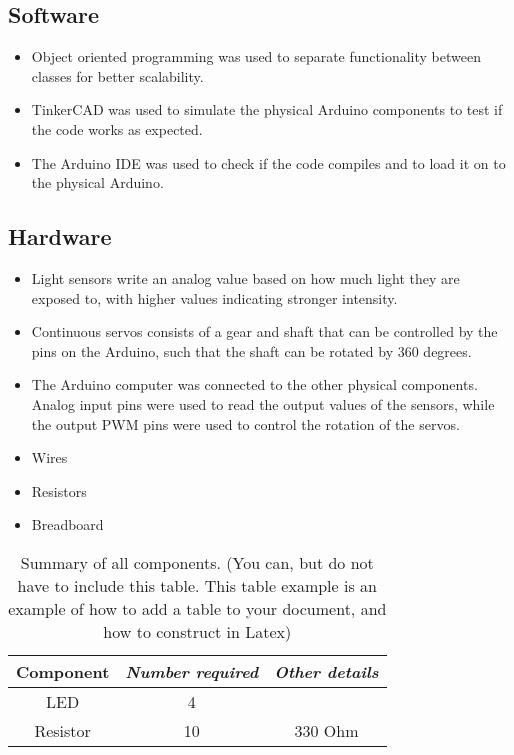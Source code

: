 \documentclass[journal]{IEEEtran}
\begin{document}

\subsection{Software}
\begin{itemize}
    \item{Object oriented programming was used to separate functionality between classes for better scalability.}
    \item{TinkerCAD was used to simulate the physical Arduino components to test if the code works as expected.}
    \item{The Arduino IDE was used to check if the code compiles and to load it on to the physical Arduino.}
\end{itemize}
\subsection{Hardware}
\begin{itemize}
    \item{Light sensors write an analog value based on how much light they are exposed to, with higher values indicating stronger intensity.}
    \item{Continuous servos consists of a gear and shaft that can be controlled by the pins on the Arduino, such that the shaft can be rotated by 360 degrees.}
    \item{The Arduino computer was connected to the other physical components. Analog input pins were used to read the output values of the sensors, while the output PWM pins were used to control the rotation of the servos.}
    \item{Wires}
    \item{Resistors}
    \item{Breadboard}
\end{itemize}


\newpage
\begin{table}[htbp]
\caption{Summary of all components. (You can, but do not have to include this table. This table example is an example of how to add a table to  your document, and how to construct in Latex)}
\begin{center}
\begin{tabular}{|c|c|c|}
\hline
\textbf{Component} & \textbf{\textit{Number required}}& \textbf{\textit{Other details}}\\
\hline
LED& 4 &  \\
Resistor& 10 &  330 Ohm\\
\hline
\end{tabular}
\label{tab1}
\end{center}
\end{table}
\end{document}
